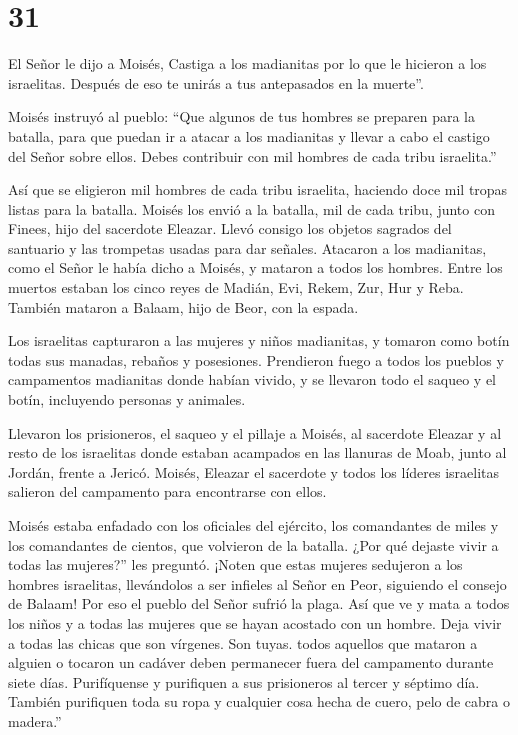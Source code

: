 \hypertarget{section-30}{%
\section{31}\label{section-30}}

 El Señor le dijo a Moisés,  Castiga a los
madianitas por lo que le hicieron a los israelitas. Después de eso te
unirás a tus antepasados en la muerte''.

 Moisés instruyó al pueblo: ``Que algunos de tus hombres se
preparen para la batalla, para que puedan ir a atacar a los madianitas y
llevar a cabo el castigo del Señor sobre ellos.  Debes
contribuir con mil hombres de cada tribu israelita.''

 Así que se eligieron mil hombres de cada tribu israelita,
haciendo doce mil tropas listas para la batalla.  Moisés los
envió a la batalla, mil de cada tribu, junto con Finees, hijo del
sacerdote Eleazar. Llevó consigo los objetos sagrados del santuario y
las trompetas usadas para dar señales.  Atacaron a los
madianitas, como el Señor le había dicho a Moisés, y mataron a todos los
hombres.  Entre los muertos estaban los cinco reyes de
Madián, Evi, Rekem, Zur, Hur y Reba. También mataron a Balaam, hijo de
Beor, con la espada.

 Los israelitas capturaron a las mujeres y niños madianitas,
y tomaron como botín todas sus manadas, rebaños y posesiones.
 Prendieron fuego a todos los pueblos y campamentos
madianitas donde habían vivido,  y se llevaron todo el
saqueo y el botín, incluyendo personas y animales.

 Llevaron los prisioneros, el saqueo y el pillaje a Moisés,
al sacerdote Eleazar y al resto de los israelitas donde estaban
acampados en las llanuras de Moab, junto al Jordán, frente a Jericó.
 Moisés, Eleazar el sacerdote y todos los líderes
israelitas salieron del campamento para encontrarse con ellos.

 Moisés estaba enfadado con los oficiales del ejército, los
comandantes de miles y los comandantes de cientos, que volvieron de la
batalla.  ¿Por qué dejaste vivir a todas las mujeres?'' les
preguntó.  ¡Noten que estas mujeres sedujeron a los hombres
israelitas, llevándolos a ser infieles al Señor en Peor, siguiendo el
consejo de Balaam! Por eso el pueblo del Señor sufrió la plaga.
 Así que ve y mata a todos los niños y a todas las mujeres
que se hayan acostado con un hombre.  Deja vivir a todas
las chicas que son vírgenes. Son tuyas.  todos aquellos que
mataron a alguien o tocaron un cadáver deben permanecer fuera del
campamento durante siete días. Purifíquense y purifiquen a sus
prisioneros al tercer y séptimo día.  También purifiquen
toda su ropa y cualquier cosa hecha de cuero, pelo de cabra o madera.''

